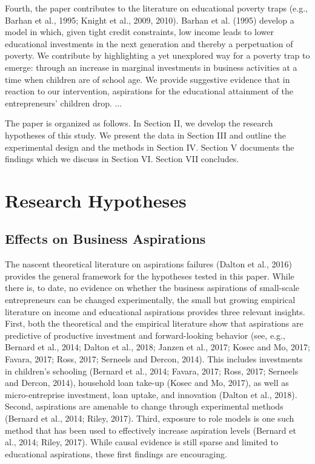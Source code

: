 \documentclass[11.5pt]{article}
\begin{document}
Fourth, the paper contributes to the literature on educational poverty traps (e.g., Barhan et al., 1995; Knight et al., 2009, 2010). Barhan et al. (1995) develop a model in which, given tight credit constraints, low income leads to lower educational investments in the next generation and thereby a perpetuation of poverty. We contribute by highlighting a yet unexplored way for a poverty trap to emerge: through an increase in marginal investments in business activities at a time when children are of school age. We provide suggestive evidence that in reaction to our intervention, aspirations for the educational attainment of the entrepreneurs' children drop. ...

The paper is organized as follows. In Section II, we develop the research hypotheses of this study. We present the data in Section III and outline the experimental design and the methods in Section IV. Section V documents the findings which we discuss in Section VI. Section VII concludes.

\section{Research Hypotheses} \label{sec:hypotheses}

\subsection{Effects on Business Aspirations}

The nascent theoretical literature on aspirations failures (Dalton et al., 2016) provides the general framework for the hypotheses tested in this paper. While there is, to date, no evidence on whether the business aspirations of small-scale entrepreneurs can be changed experimentally, the small but growing empirical literature on income and educational aspirations provides three relevant insights. First, both the theoretical and the empirical literature show that aspirations are predictive of productive investment and forward-looking behavior (see, e.g., Bernard et al., 2014; Dalton et al., 2018; Janzen et al., 2017; Kosec and Mo, 2017; Favara, 2017; Ross, 2017; Serneels and Dercon, 2014). This includes investments in children's schooling (Bernard et al., 2014; Favara, 2017; Ross, 2017; Serneels and Dercon, 2014), household loan take-up (Kosec and Mo, 2017), as well as micro-entreprise investment, loan uptake, and innovation (Dalton et al., 2018). Second, aspirations are amenable to change through experimental methods (Bernard et al., 2014; Riley, 2017). Third, exposure to role models is one such method that has been used to effectively increase aspiration levels (Bernard et al., 2014; Riley, 2017). While causal evidence is still sparse and limited to educational aspirations, these first findings are encouraging.
\end{document}
